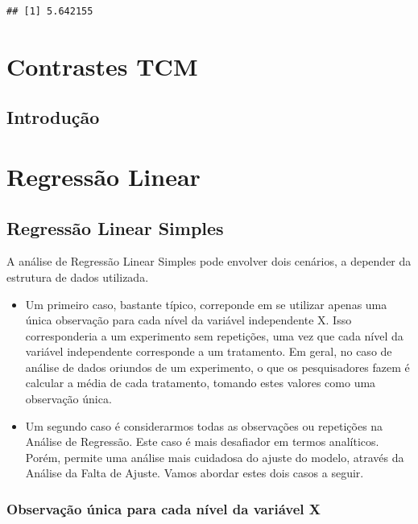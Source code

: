 \documentclass[
]{book}
\begin{document}
\begin{verbatim}
## [1] 5.642155
\end{verbatim}

\chapter{Contrastes TCM}\label{contrastes-tcm}

\section{Introdução}\label{introduuxe7uxe3o-2}

\chapter{Regressão Linear}\label{regressuxe3o-linear}

\section{Regressão Linear Simples}\label{regressuxe3o-linear-simples}

A análise de Regressão Linear Simples pode envolver dois cenários, a depender da estrutura de dados utilizada.

\begin{itemize}
\item
  Um primeiro caso, bastante típico, correponde em se utilizar apenas uma única observação para cada nível da variável independente X. Isso corresponderia a um experimento sem repetições, uma vez que cada nível da variável independente corresponde a um tratamento. Em geral, no caso de análise de dados oriundos de um experimento, o que os pesquisadores fazem é calcular a média de cada tratamento, tomando estes valores como uma observação única.
\item
  Um segundo caso é considerarmos todas as observações ou repetições na Análise de Regressão. Este caso é mais desafiador em termos analíticos. Porém, permite uma análise mais cuidadosa do ajuste do modelo, através da Análise da Falta de Ajuste. Vamos abordar estes dois casos a seguir.
\end{itemize}

\subsection{Observação única para cada nível da variável X}\label{observauxe7uxe3o-uxfanica-para-cada-nuxedvel-da-variuxe1vel-x}
\end{document}

